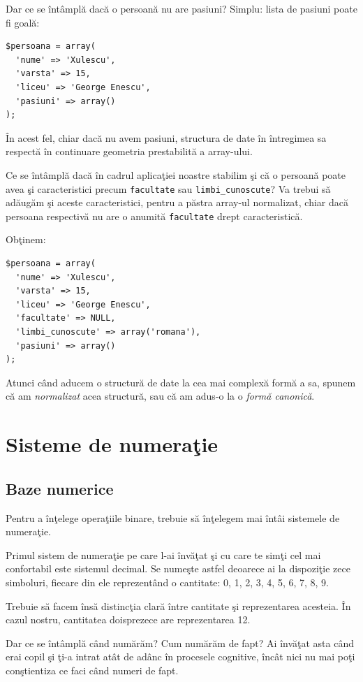 Dar ce se întâmplă dacă o persoană nu are pasiuni? Simplu: lista de pasiuni
poate fi goală:
\begin{lstlisting}
$persoana = array(
  'nume' => 'Xulescu',
  'varsta' => 15,
  'liceu' => 'George Enescu',
  'pasiuni' => array()
);
\end{lstlisting}
În acest fel, chiar dacă nu avem pasiuni, structura de date în întregimea sa
respectă în continuare geometria prestabilită a array-ului.

Ce se întâmplă dacă în cadrul aplicaţiei noastre stabilim şi că
o persoană poate avea şi caracteristici precum \texttt{facultate}
sau \texttt{limbi\_cunoscute}? Va trebui să adăugăm şi aceste caracteristici,
pentru a păstra array-ul normalizat, chiar dacă persoana respectivă nu are
o anumită \texttt{facultate} drept caracteristică.

Obţinem:
\begin{lstlisting}
$persoana = array(
  'nume' => 'Xulescu',
  'varsta' => 15,
  'liceu' => 'George Enescu',
  'facultate' => NULL,
  'limbi_cunoscute' => array('romana'),
  'pasiuni' => array()
);
\end{lstlisting}

Atunci când aducem o structură de date la cea mai complexă formă a sa,
spunem că am \textsl{normalizat} acea structură, sau că am adus-o la o \textsl{formă
canonică}.

\section{Sisteme de numeraţie}
\subsection{Baze numerice}
Pentru a înţelege operaţiile binare, trebuie să înţelegem mai întâi sistemele
de numeraţie.

Primul sistem de numeraţie pe care l-ai învăţat şi cu care te simţi cel
mai confortabil este sistemul decimal. Se numeşte astfel deoarece
ai la dispoziţie zece simboluri, fiecare din ele reprezentând o cantitate:
0, 1, 2, 3, 4, 5, 6, 7, 8, 9.

Trebuie să facem însă distincţia clară între cantitate şi reprezentarea
acesteia. În cazul nostru, cantitatea doisprezece are reprezentarea 12.

Dar ce se întâmplă când numărăm? Cum numărăm de fapt? Ai învăţat
asta când erai copil şi ţi-a intrat atât de adânc în procesele cognitive,
încât nici nu mai poţi conştientiza ce faci când numeri de fapt.


